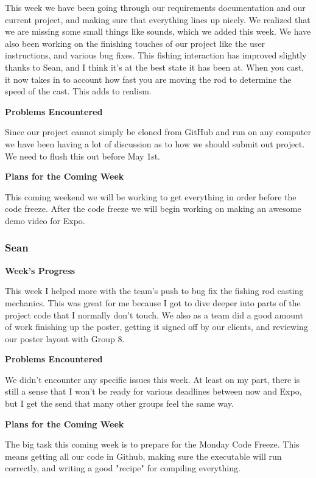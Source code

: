 \documentclass[10pt,journal,compsoc,onecolumn, draftclsnofoot]{IEEEtran}
\begin{document}
This week we have been going through our requirements documentation and our current project, and making sure that everything lines up nicely. We realized that we are missing some small things like sounds, which we added this week. We have also been working on the finishing touches of our project like the user instructions, and various bug fixes. This fishing interaction has improved slightly thanks to Sean, and I think it's at the best state it has been at. When you cast, it now takes in to account how fast you are moving the rod to determine the speed of the cast. This adds to realism.

\noindent \textbf{Problems Encountered}

Since our project cannot simply be cloned from GitHub and run on any computer we have been having a lot of discussion as to how we should submit out project. We need to flush this out before May 1st.

\noindent \textbf{Plans for the Coming Week}

This coming weekend we will be working to get everything in order before the code freeze. After the code freeze we will begin working on making an awesome demo video for Expo.

\subsubsection{Sean}
\noindent \textbf{Week's Progress}

This week I helped more with the team's push to bug fix the fishing rod casting mechanics. This was great for me because I got to dive deeper into parts of the project code that I normally don't touch. We also as a team did a good amount of work finishing up the poster, getting it signed off by our clients, and reviewing our poster layout with Group 8.

\noindent \textbf{Problems Encountered}

We didn't encounter any specific issues this week. At least on my part, there is still a sense that I won't be ready for various deadlines between now and Expo, but I get the send that many other groups feel the same way.

\noindent \textbf{Plans for the Coming Week}

The big task this coming week is to prepare for the Monday Code Freeze. This means getting all our code in Github, making sure the executable will run correctly, and writing a good "recipe" for compiling everything.
\end{document}
